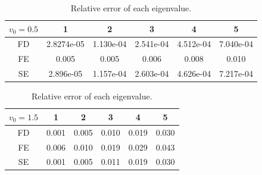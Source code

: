 \begin{table} [H]
	\centering
	\caption{Relative error of each eigenvalue.}
	\begin{tabular}{|c|c|c|c|c|c|}
		\hline
		$v_0=0.5$   & 1 & 2 & 3 & 4 & 5 \\
		\hline
		FD & 2.8274e-05 & 1.130e-04 & 2.541e-04 & 4.512e-04 & 7.040e-04 \\
		\hline
		FE & 0.005 & 0.005 & 0.006 & 0.008 & 0.010  \\
		\hline
		SE & 2.896e-05 & 1.157e-04 & 2.603e-04 & 4.626e-04 & 7.217e-04 \\
		\hline
	\end{tabular}
	\begin{tabular}{|c|c|c|c|c|c|}
		\hline
		$v_0=1.5$   & 1 & 2 & 3 & 4 & 5 \\
		\hline
		FD & 0.001 & 0.005 & 0.010 & 0.019 & 0.030 \\
		\hline
		FE & 0.006 & 0.010 & 0.019 & 0.029 & 0.043  \\
		\hline
		SE & 0.001 & 0.005 & 0.011 & 0.019 & 0.030 \\
		\hline
	\end{tabular}
	\label{table:eigenvalue_error}
\end{table}

